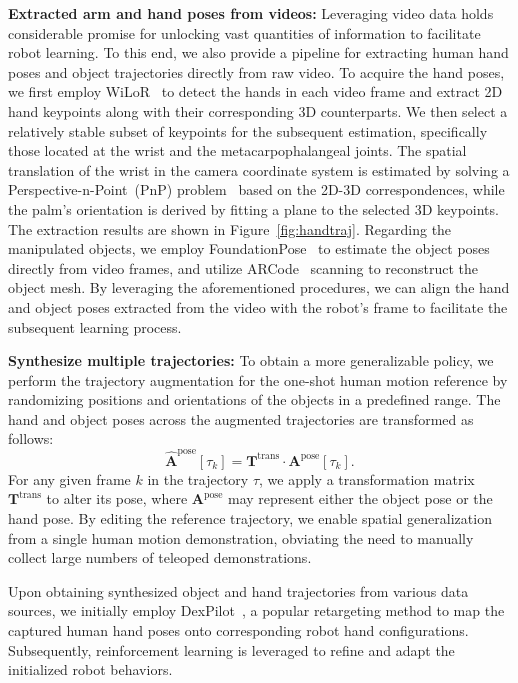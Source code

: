

\textbf{Extracted arm and hand poses from videos:} 
Leveraging video data holds considerable promise for unlocking vast quantities of information to facilitate robot learning. To this end, we also provide a pipeline for extracting human hand poses and object trajectories directly from raw video. To acquire the hand poses, we first employ WiLoR~\cite{potamias2024wilor} to detect the hands in each video frame and extract 2D hand keypoints along with their corresponding 3D counterparts. We then select a relatively stable subset of keypoints for the subsequent estimation, specifically those located at the wrist and the metacarpophalangeal joints. The spatial translation of the wrist in the camera coordinate system is estimated by solving a Perspective-n-Point~(PnP) problem~\cite{li2012robust} based on the 2D-3D correspondences, while the palm's orientation is derived by fitting a plane to the selected 3D keypoints. The extraction results are shown in Figure~\ref{fig:handtraj}. Regarding the manipulated objects, we employ FoundationPose~\cite{wen2024foundationpose} to estimate the object poses directly from video frames, and utilize ARCode~\cite{arcode2022} scanning to reconstruct the object mesh. By leveraging the aforementioned procedures, we can align the hand and object poses extracted from the video with the robot's frame to facilitate the subsequent learning process.   

\textbf{Synthesize multiple trajectories:} To obtain a more generalizable policy, we perform the trajectory augmentation for the one-shot human motion reference by randomizing positions and orientations of the objects in a predefined range. The hand and object poses across the augmented trajectories are transformed as follows:
\begin{equation}
\hat{\mathbf{A}}^{\mathrm{pose}}\left[\tau_k\right]=\mathbf{T}^{\mathrm{trans}} \cdot\mathbf{A}^{\mathrm{pose}}\left[\tau_k\right] .
\end{equation}
For any given frame $k$ in the trajectory $\tau$, we apply a transformation matrix $\mathbf{T}^{\mathrm{trans}}$ to alter its pose, where $\mathbf{A}^{\mathrm{pose}}$ may represent either the object pose or the hand pose. By editing the reference trajectory, we enable spatial generalization from a single human motion demonstration, obviating the need to manually collect large numbers of teleoped demonstrations.

Upon obtaining synthesized object and hand trajectories from various data sources, we initially employ DexPilot~\cite{handa2020dexpilot}, a popular retargeting method to map the captured human hand poses onto corresponding robot hand configurations. Subsequently, reinforcement learning is leveraged to refine and adapt the initialized robot behaviors.



